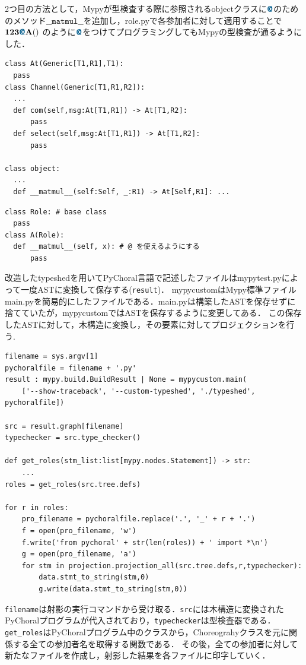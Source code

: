\documentclass{thesis}
\newcommand{\mblue}[1]{\textbf{\textsf{\color{MidnightBlue}#1}}}
\begin{document}
2つ目の方法として，Mypyが型検査する際に参照されるobjectクラスに$\mblue{@}$のためのメソッド$\texttt{\_\_matmul\_\_}$を追加し，role.pyで各参加者に対して適用することで$\mathbf{123\mblue{@}A()}$
のように$\mblue{@}$をつけてプログラミングしてもMypyの型検査が通るようにした．
\begin{lstlisting}[caption=builtins.pyi]
class At(Generic[T1,R1],T1):
  pass
class Channel(Generic[T1,R1,R2]):
  ... 
  def com(self,msg:At[T1,R1]) -> At[T1,R2]:
      pass
  def select(self,msg:At[T1,R1]) -> At[T1,R2]:
      pass

class object:
  ... 
  def __matmul__(self:Self, _:R1) -> At[Self,R1]: ...
\end{lstlisting}
\begin{lstlisting}[caption=role.py]
class Role: # base class
  pass
class A(Role):
  def __matmul__(self, x): # @ を使えるようにする
      pass
\end{lstlisting}
改造したtypeshedを用いてPyChoral言語で記述したファイルはmypytest.pyによって一度ASTに変換して保存する(\texttt{result})．
mypycustomはMypy標準ファイルmain.pyを簡易的にしたファイルである．main.pyは構築したASTを保存せずに捨てていたが，mypycustomではASTを保存するように変更してある．
この保存したASTに対して，木構造に変換し，その要素に対してプロジェクションを行う.
\begin{lstlisting}[caption=mypytest.py,label=mypytest]
filename = sys.argv[1]
pychoralfile = filename + '.py'
result : mypy.build.BuildResult | None = mypycustom.main(
    ['--show-traceback', '--custom-typeshed', './typeshed', pychoralfile])

src = result.graph[filename] 
typechecker = src.type_checker()

def get_roles(stm_list:list[mypy.nodes.Statement]) -> str:
    ... 
roles = get_roles(src.tree.defs)

for r in roles:
    pro_filename = pychoralfile.replace('.', '_' + r + '.')
    f = open(pro_filename, 'w')
    f.write('from pychoral' + str(len(roles)) + ' import *\n') 
    g = open(pro_filename, 'a')
    for stm in projection.projection_all(src.tree.defs,r,typechecker):
        data.stmt_to_string(stm,0)
        g.write(data.stmt_to_string(stm,0))
\end{lstlisting}
\texttt{filename}は射影の実行コマンドから受け取る．\texttt{src}には木構造に変換されたPyChoralプログラムが代入されており，\texttt{typechecker}は型検査器である．
\texttt{get\_roles}はPyChoralプログラム中のクラスから，Choreograhyクラスを元に関係する全ての参加者名を取得する関数である．
その後，全ての参加者に対して新たなファイルを作成し，射影した結果を各ファイルに印字していく．
\end{document}
